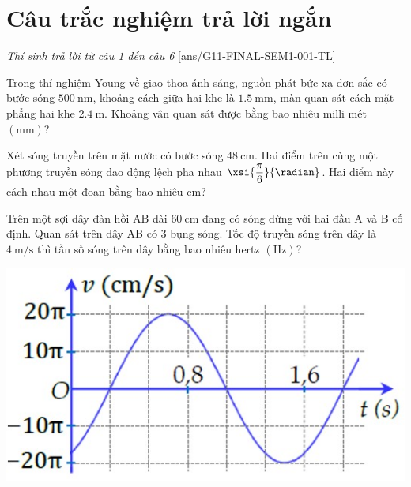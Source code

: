 \section{Câu trắc nghiệm trả lời ngắn} \textit{Thí sinh trả lời từ câu 1 đến câu 6}
\setcounter{ex}{0}
[ans/G11-FINAL-SEM1-001-TL]
\begin{ex}
	Trong thí nghiệm Young về giao thoa ánh sáng, nguồn phát bức xạ đơn sắc có bước sóng $\SI{500}{\nano\meter}$, khoảng cách giữa hai khe là $\SI{1.5}{\milli\meter}$, màn quan sát cách mặt phẳng hai khe $\SI{2.4}{\meter}$. Khoảng vân quan sát được bằng bao nhiêu milli mét $\left(\si{\milli\meter}\right)$? 
\end{ex}
\begin{ex}
	Xét sóng truyền trên mặt nước có bước sóng $\SI{48}{\centi\meter}$. Hai điểm trên cùng một phương truyền sóng dao động lệch pha nhau $\xsi{\dfrac{\pi}{6}}{\radian}$. Hai điểm này cách nhau một đoạn bằng bao nhiêu $\si{\centi\meter}$?
\end{ex}
\begin{ex}
	Trên một sợi dây đàn hồi AB dài $\SI{60}{\centi\meter}$ đang có sóng dừng với hai đầu A và B cố định. Quan sát trên dây AB có 3 bụng sóng. Tốc độ truyền sóng trên dây là $\SI{4}{\meter/\second}$ thì tần số sóng trên dây bằng bao nhiêu hertz $\left(\si{\hertz}\right)$? 
\end{ex}
\begin{ex}
	{\vspace{-0.5cm}\includegraphics[scale=0.5]{../figs/G11-FINAL-SEM1-001-4}}
\end{ex}
